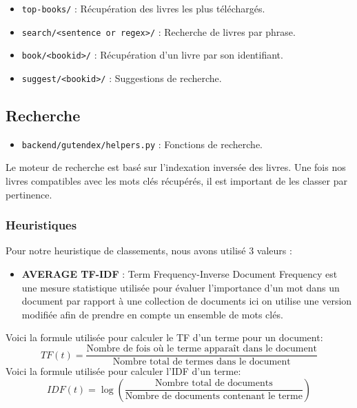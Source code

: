 \documentclass[
  12pt,
]{article}
\providecommand{\tightlist}{%
  \setlength{\itemsep}{0pt}\setlength{\parskip}{0pt}}
\begin{document}
\begin{itemize}
\tightlist
\item
  \texttt{top-books/} : Récupération des livres les plus téléchargés.
\item
  \texttt{search/\textless{}sentence\ or\ regex\textgreater{}/} :
  Recherche de livres par phrase.
\item
  \texttt{book/\textless{}bookid\textgreater{}/} : Récupération d'un
  livre par son identifiant.
\item
  \texttt{suggest/\textless{}bookid\textgreater{}/} : Suggestions de
  recherche.
\end{itemize}

\subsection{Recherche}\label{recherche}

\begin{itemize}
\tightlist
\item
  \texttt{backend/gutendex/helpers.py} : Fonctions de recherche.
\end{itemize}

Le moteur de recherche est basé sur l'indexation inversée des livres.
Une fois nos livres compatibles avec les mots clés récupérés, il est
important de les classer par pertinence.

\subsubsection{Heuristiques}\label{heuristiques}

Pour notre heuristique de classements, nous avons utilisé 3 valeurs :

\begin{itemize}
\tightlist
\item
  \textbf{AVERAGE TF-IDF} : Term Frequency-Inverse Document Frequency
  est une mesure statistique utilisée pour évaluer l'importance d'un mot
  dans un document par rapport à une collection de documents ici on
  utilise une version modifiée afin de prendre en compte un ensemble de
  mots clés.
\end{itemize}

Voici la formule utilisée pour calculer le TF d'un terme pour un
document:
\[TF(t) = \frac{\text{Nombre de fois où le terme apparaît dans le document}}{\text{Nombre total de termes dans le document}}\]
Voici la formule utilisée pour calculer l'IDF d'un terme:
\[IDF(t) = \log\left(\frac{\text{Nombre total de documents}}{\text{Nombre de documents contenant le terme}}\right)\]
\end{document}
